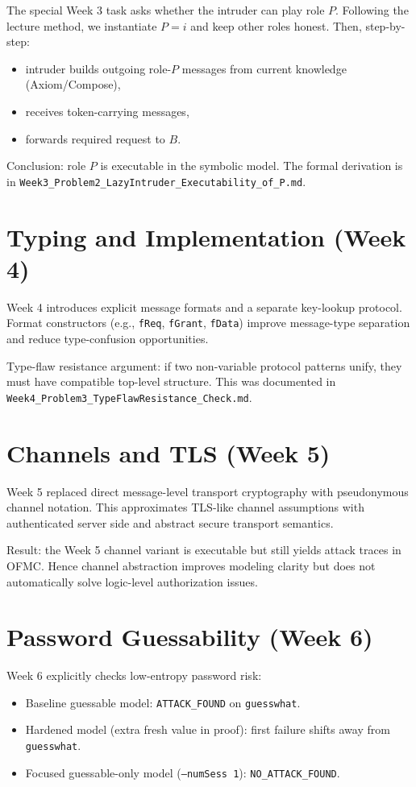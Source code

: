 \documentclass[11pt,a4paper]{article}
\begin{document}
The special Week 3 task asks whether the intruder can play role $P$.
Following the lecture method, we instantiate $P=i$ and keep other roles honest.
Then, step-by-step:
\begin{itemize}
  \item intruder builds outgoing role-$P$ messages from current knowledge (Axiom/Compose),
  \item receives token-carrying messages,
  \item forwards required request to $B$.
\end{itemize}

Conclusion: role $P$ is executable in the symbolic model.
The formal derivation is in \texttt{Week3\_Problem2\_LazyIntruder\_Executability\_of\_P.md}.

\section{Typing and Implementation (Week 4)}

Week 4 introduces explicit message formats and a separate key-lookup protocol.
Format constructors (e.g., \texttt{fReq}, \texttt{fGrant}, \texttt{fData}) improve message-type separation and reduce type-confusion opportunities.

Type-flaw resistance argument:
if two non-variable protocol patterns unify, they must have compatible top-level structure.
This was documented in \texttt{Week4\_Problem3\_TypeFlawResistance\_Check.md}.

\section{Channels and TLS (Week 5)}

Week 5 replaced direct message-level transport cryptography with pseudonymous channel notation.
This approximates TLS-like channel assumptions with authenticated server side and abstract secure transport semantics.

Result: the Week 5 channel variant is executable but still yields attack traces in OFMC.
Hence channel abstraction improves modeling clarity but does not automatically solve logic-level authorization issues.

\section{Password Guessability (Week 6)}

Week 6 explicitly checks low-entropy password risk:
\begin{itemize}
  \item Baseline guessable model: \texttt{ATTACK\_FOUND} on \texttt{guesswhat}.
  \item Hardened model (extra fresh value in proof): first failure shifts away from \texttt{guesswhat}.
  \item Focused guessable-only model (\texttt{--numSess 1}): \texttt{NO\_ATTACK\_FOUND}.
\end{itemize}
\end{document}
